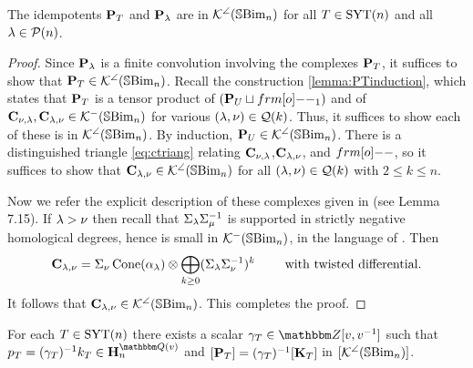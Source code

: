 \begin{lemma}
The idempotents ${\mathbf P}_T$ and ${\mathbf P}_\lambda$ are in ${\mathcal{K}}^{\angle}({\mathbb{S}}{\rm Bim }_n)$ for all $T\in \operatorname{SYT}(n)$ and all $\lambda\in {\mathcal{P}}(n)$.
\end{lemma}
\begin{proof}
Since ${\mathbf P}_\lambda$ is a finite convolution involving the complexes ${\mathbf P}_T$, it suffices to show that ${\mathbf P}_T\in {\mathcal{K}}^{\angle}({\mathbb{S}}{\rm Bim }_n)$.  Recall the construction \ref{lemma:PTinduction}, which states that ${\mathbf P}_T$ is a tensor product of $(\PB_U \sqcup \one_1)$ and of ${\mathbf C}_{\nu,\lambda},{\mathbf C}_{\lambda,\nu}\in {\mathcal{K}}^-({\mathbb{S}}{\rm Bim }_n)$ for various $(\lambda,\nu)\in{\mathcal{Q}}(k)$.  Thus, it suffices to show each of these is in ${\mathcal{K}}^{\angle}({\mathbb{S}}{\rm Bim }_n)$. By induction, ${\mathbf P}_U \in {\mathcal{K}}^{\angle}({\mathbb{S}}{\rm Bim }_n)$. There is a distinguished triangle \eqref{eq:ctriang} relating ${\mathbf C}_{\nu,\lambda}$,${\mathbf C}_{\lambda,\nu}$, and $\one$, so it suffices to show that ${\mathbf C}_{\lambda,\nu}\in{\mathcal{K}}^{\angle}({\mathbb{S}}{\rm Bim }_n)$ for all $(\lambda,\nu)\in {\mathcal{Q}}(k)$ with $2\leq k\leq n$.

 Now we refer the explicit description of these complexes given in \cite{ElHog17a} (see Lemma 7.15).  If $\lambda>\nu$ then recall that $\Sigma_\lambda\Sigma_\mu^{-1}$ is supported in strictly negative homological degrees, hence is small in ${\mathcal{K}}^-({\mathbb{S}}{\rm Bim }_n)$, in the language of \cite{ElHog17a}.  Then
 \[
 {\mathbf C}_{\lambda,\nu} = \Sigma_\nu \operatorname{Cone}(\alpha_\lambda)\otimes \bigoplus_{k\geq 0} (\Sigma_\lambda\Sigma_\nu^{-1})^k \qquad\text{ with twisted differential}.
 \]
 It follows that ${\mathbf C}_{\lambda,\nu}\in {\mathcal{K}}^{\angle}({\mathbb{S}}{\rm Bim }_n)$.  This completes the proof.
\end{proof}

\begin{lemma} \label{lem:grothPvK}
For each $T\in \operatorname{SYT}(n)$ there exists a scalar $\g_T\in \Z[v,v\inv]$ such that $p_T = (\g_T)\inv k_T\in \HB_n^{\Q(v)}$ and $[{\mathbf P}_T] = (\gamma_T)^{-1} [{\mathbf K}_T]$ in $[{\mathcal{K}}^{\angle}({\mathbb{S}}{\rm Bim }_n)]$.
\end{lemma}

